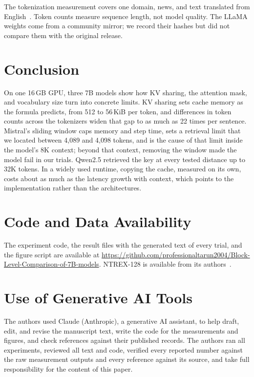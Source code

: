\documentclass[conference]{IEEEtran}
\begin{document}
The tokenization measurement covers one domain, news, and text translated from English~\cite{ntrex}. Token counts measure sequence length, not model quality. The LLaMA weights come from a community mirror; we record their hashes but did not compare them with the original release.

\section{Conclusion}
On one 16\,GB GPU, three 7B models show how KV sharing, the attention mask, and vocabulary size turn into concrete limits. KV sharing sets cache memory as the formula predicts, from 512 to 56\,KiB per token, and differences in token counts across the tokenizers widen that gap to as much as 22 times per sentence. Mistral's sliding window caps memory and step time, sets a retrieval limit that we located between 4,089 and 4,098 tokens, and is the cause of that limit inside the model's 8K context; beyond that context, removing the window made the model fail in our trials. Qwen2.5 retrieved the key at every tested distance up to 32K tokens. In a widely used runtime, copying the cache, measured on its own, costs about as much as the latency growth with context, which points to the implementation rather than the architectures.

\section*{Code and Data Availability}
The experiment code, the result files with the generated text of every trial, and the figure script are available at \url{https://github.com/professionaltarun2004/Block-Level-Comparison-of-7B-models}. NTREX-128 is available from its authors~\cite{ntrex}.

\section*{Use of Generative AI Tools}
The authors used Claude (Anthropic), a generative AI assistant, to help draft, edit, and revise the manuscript text, write the code for the measurements and figures, and check references against their published records. The authors ran all experiments, reviewed all text and code, verified every reported number against the raw measurement outputs and every reference against its source, and take full responsibility for the content of this paper.
\end{document}
